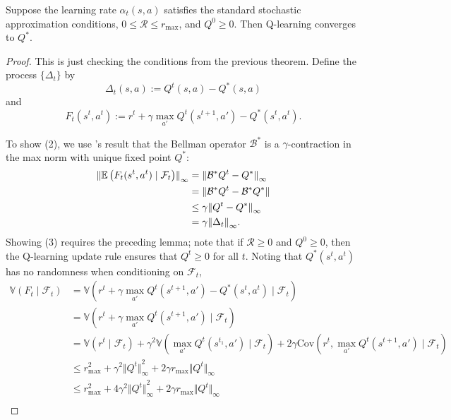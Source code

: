 \documentclass[twoside,10pt]{report}
\begin{document}
\begin{prop}
	Suppose the learning rate $\alpha_{t}(s,a)$ satisfies the standard stochastic approximation conditions, $0 \leq \mathcal{R} \leq r_{\text{max}}$, and $Q^{0} \geq 0$. Then Q-learning converges to $Q^{*}$.
\end{prop}
\begin{proof}
	This is just checking the conditions from the previous theorem. Define the process $\{\Delta_{t}\}$ by
	\[
	\Delta_{t}(s,a) := Q^{t}(s,a) - Q^{*}(s,a)
	\] and
	\[
	F_{t}(s^{t},a^{t}) := r^{t} + \gamma \max_{a'} Q^{t}(s^{t+1},a') - Q^{*}(s^{t},a^{t}).
	\] 

	To show (2), we use 's result that the Bellman operator $\mathcal{B}^{*}$ is a $\gamma$-contraction in the max norm with unique fixed point $Q^{*}$:
	\begin{align*}
		{\Vert{\mathbb{E} \left(  F_{t}(s^{t},a^{t}) \;|\; \mathcal{F}_{t} \right)}\Vert}_{\infty} &= {\Vert{\mathcal{B}^{*} Q^{t} - Q^{*}}\Vert}_{\infty} \\
										     &= {\Vert{\mathcal{B}^{*} Q^{t} - \mathcal{B}^{*} Q^{*}}\Vert} \\
										     &\leq \gamma {\Vert{Q^{t} - Q^{*}}\Vert}_{\infty} \\
										     &= \gamma {\Vert{\Delta_{t}}\Vert}_{\infty}.
	\end{align*}
	Showing (3) requires the preceding lemma; note that if $\mathcal{R} \geq 0$ and $Q^{0} \geq 0$, then the Q-learning update rule ensures that $Q^{t} \geq 0$ for all $t$. Noting that $Q^{*}(s^{t},a^{t})$ has no randomness when conditioning on $\mathcal{F}_{t}$,
	\begin{align*}
		\mathbb{V}(F_{t} \;|\; \mathcal{F}_{t}) &= \mathbb{V}(r^{t} + \gamma \max_{a'} Q^{t}(s^{t+1},a') - Q^{*}(s^{t},a^{t}) \;|\; \mathcal{F}_{t}) \\
		&= \mathbb{V}(r^{t} + \gamma \max_{a'} Q^{t}(s^{t+1},a') \;|\; \mathcal{F}_{t}) \\
		&= \mathbb{V}(r^{t} \;|\; \mathcal{F}_{t}) + \gamma^{2}\mathbb{V}(\max_{a'}Q^{t}(s^{t_1},a') \;|\; \mathcal{F}_{t}) + 2\gamma \text{Cov}( r^{t}, \max_{a'}Q^{t}(s^{t+1},a') \;|\; \mathcal{F}_{t}) \\
		&\leq r_{\text{max}}^2 + \gamma^{2} {\Vert{Q^{t}}\Vert}_\infty^2 + 2\gamma r_{\text{max}} {\Vert{Q^{t}}\Vert}_{\infty} \\
		&\leq r_{\text{max}}^2 + 4 \gamma^{2} {\Vert{Q^{t}}\Vert}_\infty^2 + 2\gamma r_{\text{max}} {\Vert{Q^{t}}\Vert}_{\infty} \\

\end{align*}
\end{proof}
\end{document}
